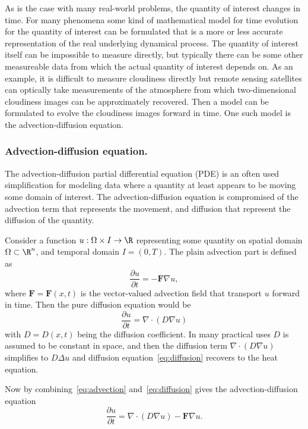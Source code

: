 As is the case with many real-world problems, the quantity of interest changes in time.
For many phenomena some kind of mathematical model for time evolution for the quantity of interest can be formulated that is a more or less accurate representation of the real underlying dynamical process.
The quantity of interest itself can be impossible to measure directly, but typically there can be some other measureable data from which the actual quantity of interest depends on.
As an example, it is difficult to measure cloudiness directly but remote sensing satellites can optically take measurements of the atmosphere from which two-dimensional cloudiness images can be approximately recovered.
Then a model can be formulated to evolve the cloudiness images forward in time.
One such model is the advection-diffusion equation.

\subsubsection{Advection-diffusion equation.}
The advection-diffusion partial differential equation (PDE) is an often used simplification for modeling data where a quantity at least appears to be moving some domain of interest.
The advection-diffusion equation is compromised of the advection term that represents the movement, and diffusion that represent the diffusion of the quantity.

Consider a function $u: \Omega \times I \rightarrow \R$ representing some quantity on spatial domain $\Omega \subset \R^n$, and temporal domain $I = (0, T)$.
The plain advection part is defined as
\begin{equation}\label{eq:advection}
    \frac{\partial u}{\partial t} =  - \mathbf{F} \nabla u,
\end{equation}
where $\mathbf{F} = \mathbf{F}(x,t)$ is the vector-valued advection field that transport $u$ forward in time.
Then the pure diffusion equation would be
\begin{equation}\label{eq:diffusion}
    \frac{\partial u}{\partial t} = \nabla \cdot (D \nabla u)
\end{equation}
with $D = D(x,t)$ being the diffusion coefficient.
In many practical uses $D$ is assumed to be constant in space, and then the diffusion term $\nabla \cdot (D \nabla u)$ simplifies to $D \Delta u$ and diffusion equation~\eqref{eq:diffusion} recovers to the heat equation.

Now by combining~\eqref{eq:advection} and~\eqref{eq:diffusion} gives the advection-diffusion equation
\begin{equation}\label{eq:advectiondiffusion}
    \frac{\partial u}{\partial t} = \nabla \cdot (D \nabla u) - \mathbf{F} \nabla u.
\end{equation}

